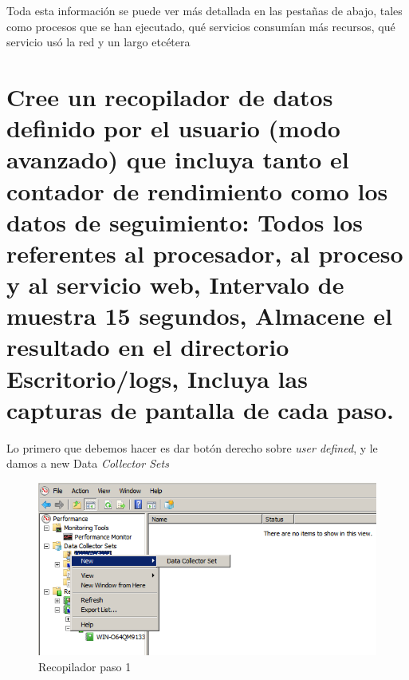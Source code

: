 Toda esta información se puede ver más detallada en las pestañas de abajo, tales como procesos que se han ejecutado, qué servicios consumían más recursos, qué servicio usó la red y un largo etcétera









\section[Cuestión 5]{ Cree un recopilador de datos definido por el usuario (modo avanzado) que incluya tanto el contador de rendimiento como los datos de seguimiento:
	Todos los referentes al procesador, al proceso y al servicio web, 
	Intervalo de muestra 15 segundos, 
	Almacene el resultado en el directorio Escritorio/logs, 
	Incluya las capturas de pantalla de cada paso.}

Lo primero que debemos hacer es dar botón derecho sobre \textit{user defined}, y le damos a new Data \textit{Collector Sets}

\begin{figure}[H] %
	\centering
	\includegraphics[scale=0.5]{pics/recopilador1.png}  %
	\caption{Recopilador paso 1} \label{fig:reco1}
\end{figure}

